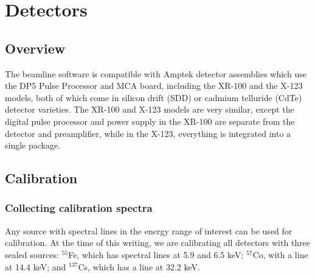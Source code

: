 \chapter{Detectors\label{chap:det}}

\section{Overview}

The beamline software is compatible with Amptek detector assemblies which use
the DP5 Pulse Processor and MCA board\cite{dp5_user_man}, including the
XR-100\cite{xr-100-sdd-manual} and the
X-123\cite{x-123-sdd-manual,x-123-cdte-manual} models, both of which come in
silicon drift (SDD) or cadmium telluride (CdTe) detector varieties. The XR-100
and X-123 models are very similar, except the digital pulse processor and power
supply in the XR-100 are separate from the detector and preamplifier, while in
the X-123, everything is integrated into a single package.





\section{Calibration\label{sec:calib}}

\subsection{Collecting calibration spectra}

Any source with spectral lines in the energy range of interest can be
used for calibration. At the time of this writing, we are calibrating
all detectors with three sealed sources: $^{55}$Fe, which has spectral
lines at 5.9 and 6.5 keV; $^{57}$Co, with a line at 14.4 keV; and
$^{137}$Cs, which has a line at 32.2 keV.

